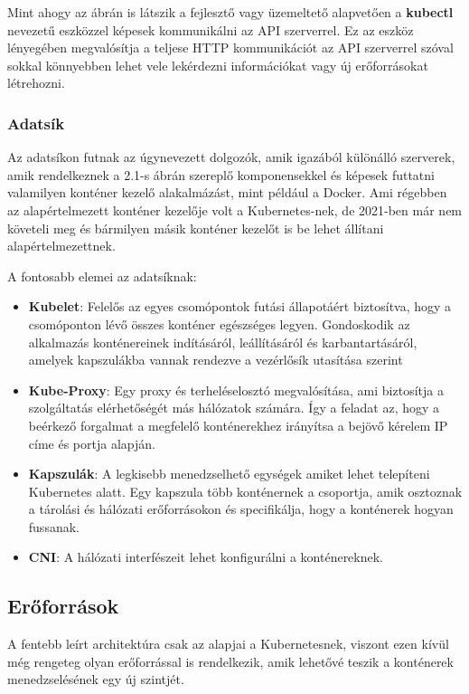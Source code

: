 Mint ahogy az ábrán is látszik a fejlesztő vagy üzemeltető alapvetően a \textbf{kubectl}
nevezetű eszközzel képesek kommunikálni az API szerverrel. Ez az eszköz lényegében
megvalósítja a teljese HTTP kommunikációt az API szerverrel szóval sokkal könnyebben 
lehet vele lekérdezni információkat vagy új erőforrásokat létrehozni. 

\subsubsection{Adatsík}

Az adatsíkon futnak az úgynevezett dolgozók, amik igazából különálló szerverek,
amik rendelkeznek a 2.1-s ábrán szereplő komponensekkel és képesek futtatni 
valamilyen konténer kezelő alakalmázást, mint például a Docker. Ami régebben az 
alapértelmezett konténer kezelője volt a Kubernetes-nek, de 2021-ben már nem 
követeli meg és bármilyen másik konténer kezelőt is be lehet állítani alapértelmezettnek.

A fontosabb elemei az adatsíknak:

\begin{itemize}
	\item \textbf{Kubelet}: Felelős az egyes csomópontok futási állapotáért biztosítva, 
	hogy a csomóponton lévő összes konténer egészséges legyen. Gondoskodik az alkalmazás
	konténereinek indításáról, leállításáról és karbantartásáról, amelyek kapszulákba 
	vannak rendezve a vezérlősík utasítása szerint
	\item \textbf{Kube-Proxy}: Egy proxy és terheléselosztó megvalósítása, ami biztosítja
	a szolgáltatás elérhetőségét más hálózatok számára. Így a feladat az, hogy a beérkező
	forgalmat a megfelelő konténerekhez irányítsa a bejövő kérelem IP címe és 
	portja alapján. 
	\item \textbf{Kapszulák}: A legkisebb menedzselhető egységek amiket lehet telepíteni
	Kubernetes alatt. Egy kapszula több konténernek a csoportja, amik osztoznak a tárolási
	és hálózati erőforrásokon és specifikálja, hogy a konténerek hogyan fussanak. 
	\item \textbf{CNI}: A hálózati interfészeit lehet konfigurálni a konténereknek.
\end{itemize}

\subsection{Erőforrások}

A fentebb leírt architektúra csak az alapjai a Kubernetesnek, viszont ezen kívül
még rengeteg olyan erőforrással is rendelkezik, amik lehetővé teszik a konténerek
menedzselésének egy új szintjét.

